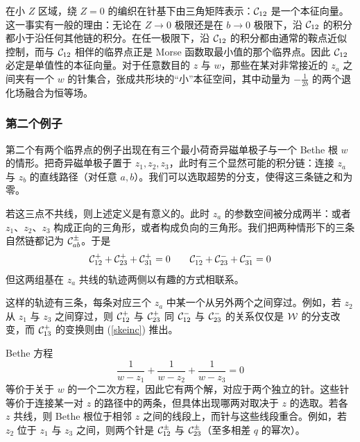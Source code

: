 
在小 $Z$ 区域，绕 $Z=0$ 的编织在针基下由三角矩阵表示：${\mathcal C}_{12}$ 是一个本征向量。这一事实有一般的理由：无论在 $Z \to 0$ 极限还是在 $b \to 0$ 极限下，沿 ${\mathcal C}_{12}$ 的积分都小于沿任何其他链的积分。在任一极限下，沿 ${\mathcal C}_{12}$ 的积分都由通常的鞍点近似控制，而与 ${\mathcal C}_{12}$ 相伴的临界点正是 Morse 函数取最小值的那个临界点。因此 ${\mathcal C}_{12}$ 必定是单值性的本征向量。对于任意数目的 $z$ 与 $w$，那些在某对非常接近的 $z_a$ 之间夹有一个 $w$ 的针集合，张成共形块的“小”本征空间，其中动量为 $- \frac{1}{2b}$ 的两个退化场融合为恒等场。

\subsubsection{第二个例子}\label{sec}

第二个有两个临界点的例子出现在有三个最小荷奇异磁单极子与一个 Bethe 根 $w$ 的情形。把奇异磁单极子置于 $z_1,z_2,z_3$，此时有三个显然可能的积分链：连接 $z_a$ 与 $z_b$ 的直线路径（对任意 $a,b$）。我们可以选取超势的分支，使得这三条链之和为零。

若这三点不共线，则上述定义是有意义的。此时 $z_a$ 的参数空间被分成两半：或者 $z_1$、$z_2$、$z_3$ 构成正向的三角形，或者构成负向的三角形。我们把两种情形下的三条自然链都记为 ${\mathcal C}_{ab}^\pm$。于是
\begin{equation} \label{skeinc}
{\mathcal C}^+_{12} + {\mathcal C}^+_{23} + {\mathcal C}^+_{31} = 0 \qquad {\mathcal C}^-_{12} + {\mathcal C}^-_{23} + {\mathcal C}^-_{31} =0
\end{equation}
但这两组基在 $z_a$ 共线的轨迹两侧以有趣的方式相联系。

这样的轨迹有三条，每条对应三个 $z_a$ 中某一个从另外两个之间穿过。例如，若 $z_2$ 从 $z_1$ 与 $z_3$ 之间穿过，则 ${\mathcal C}^+_{12}$ 与 ${\mathcal C}^+_{23}$ 同 ${\mathcal C}^-_{12}$ 与 ${\mathcal C}^-_{23}$ 的关系仅仅是 ${\mathcal W}$ 的分支改变，而 ${\mathcal C}^+_{13}$ 的变换则由 (\ref{skeinc}) 推出。

Bethe 方程
\begin{equation}\label{polz} \frac{1}{w-z_1}+\frac{1}{w-z_2}+\frac{1}{w-z_3} =0 \end{equation}
等价于关于 $w$ 的一个二次方程，因此它有两个解，对应于两个独立的针。这些针等价于连接某一对 $z$ 的路径中的两条，但具体出现哪两对取决于 $z$ 的选取。若各 $z$ 共线，则 Bethe 根位于相邻 $z$ 之间的线段上，而针与这些线段重合。例如，若 $z_2$ 位于 $z_1$ 与 $z_3$ 之间，则两个针是 ${\mathcal C}^\pm_{12}$ 与 ${\mathcal C}^\pm_{23}$（至多相差 $q$ 的幂次）。

